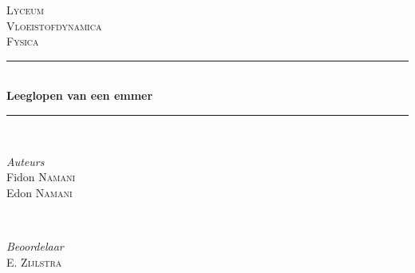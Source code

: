 \begin{titlepage} 
	\newcommand{\HRule}{\rule{\linewidth}{0.5mm}} %
	
	\center %
	
	
	\textsc{\LARGE Lyceum}\\[1.5cm] %
	
	\textsc{\Large Vloeistofdynamica}\\[0.5cm] %
	
	\textsc{\large Fysica}\\[0.5cm] %
	
	
	\HRule\\[0.4cm] %
	
	{\huge\bfseries Leeglopen van een emmer}\\[0.4cm] %
	
	\HRule\\[1.5cm]
	
	
	\begin{minipage}{0.4\textwidth}
		\begin{flushleft} %
			\large
			\textit{Auteurs}\\
			Fidon \textsc{Namani}\\ %
		    Edon \textsc{Namani}
		\end{flushleft}
	\end{minipage}
	~ %
	\begin{minipage}{0.4\textwidth}
		\begin{flushright} %
			\large
			\textit{Beoordelaar}\\
			 \textsc{E. Zijlstra} %
		\end{flushright}
	\end{minipage}



\end{titlepage}
